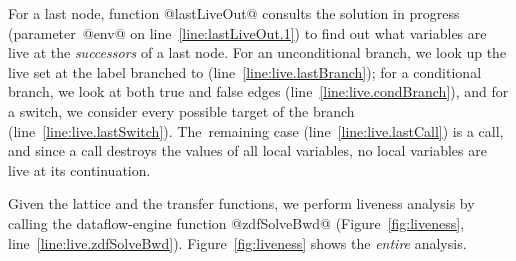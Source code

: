 \documentclass[blockstyle,preprint,natbib,nocopyrightspace]{sigplanconf}
\newcommand\lineref[1]{line~\ref{line:#1}}
\newcommand\figref[1]{Figure~\ref{fig:#1}}
\begin{document}
For a last node, function @lastLiveOut@ consults the solution in
progress (parameter~@env@ on \lineref{lastLiveOut.1}) to find out what
variables are live at the \emph{successors} of a 
last node. 
For an unconditional branch, we look up the live set at the label
branched to (\lineref{live.lastBranch});
for a conditional branch, we look at both true and false edges
(\lineref{live.condBranch}), 
 and
for a switch, we consider every possible target of the
branch (\lineref{live.lastSwitch}).
The~remaining case (\lineref{live.lastCall}) is a call, 
and since a call destroys the values of all local variables, no
local variables are live at its continuation.

Given the lattice and the transfer functions,
we perform liveness analysis by calling
the dataflow-engine function @zdfSolveBwd@ (\figref{liveness},
\lineref{live.zdfSolveBwd}). 
\figref{liveness} shows the \emph{entire} analysis.
\end{document}
